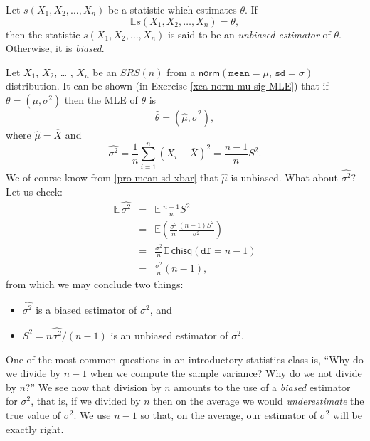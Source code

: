 \documentclass[captions=tableheading]{scrbook}
\begin{document}
\begin{defn}
Let \(s(X_{1},X_{2},\ldots,X_{n})\) be a statistic which estimates \(\theta\). If 
\[
\mathbb{E} s(X_{1},X_{2},\ldots,X_{n})=\theta,
\]
then the statistic \(s(X_{1},X_{2},\ldots,X_{n})\) is said to be an \emph{unbiased estimator} of \(\theta\). Otherwise, it is \emph{biased}.
\end{defn}

\begin{example}

Let \(X_{1}\), \(X_{2}\), \ldots{} , \(X_{n}\) be an \(SRS(n)\) from a \(\mathsf{norm}(\mathtt{mean}=\mu,\,\mathtt{sd}=\sigma)\) distribution. It can be shown (in Exercise \ref{xca-norm-mu-sig-MLE}) that if \(\mbox{$\theta$}=(\mu,\sigma^{2})\) then the MLE of \(\theta\) is
\begin{equation}
\hat{\theta}=(\hat{\mu},\hat{\sigma}^{2}),
\end{equation}
where \(\hat{\mu}=\overline{X}\) and
\begin{equation}
\hat{\sigma^{2}}=\frac{1}{n}\sum_{i=1}^{n}\left(X_{i}-\overline{X}\right)^{2}=\frac{n-1}{n}S^{2}.
\end{equation}
We of course know from \ref{pro-mean-sd-xbar} that \(\hat{\mu}\) is unbiased. What about \(\hat{\sigma^{2}}\)? Let us check: 
\begin{eqnarray*}
\mathbb{E}\,\hat{\sigma^{2}} & = & \mathbb{E}\,\frac{n-1}{n}S^{2}\\
 & = & \mathbb{E}\left(\frac{\sigma^{2}}{n}\frac{(n-1)S^{2}}{\sigma^{2}}\right)\\
 & = & \frac{\sigma^{2}}{n}\mathbb{E}\ \mathsf{chisq}(\mathtt{df}=n-1)\\
 & = & \frac{\sigma^{2}}{n}(n-1),
\end{eqnarray*}
from which we may conclude two things:
\begin{itemize}
\item \(\hat{\sigma^{2}}\) is a biased estimator of \(\sigma^{2}\), and
\item \(S^{2}=n\hat{\sigma^{2}}/(n-1)\) is an unbiased estimator of \(\sigma^{2}\).
\end{itemize}

\end{example}

One of the most common questions in an introductory statistics class is, ``Why do we divide by \(n-1\) when we compute the sample variance? Why do we not divide by \(n\)?'' We see now that division by \(n\) amounts to the use of a \emph{biased} estimator for \(\sigma^{2}\), that is, if we divided by \(n\) then on the average we would \emph{underestimate} the true value of \(\sigma^{2}\). We use \(n-1\) so that, on the average, our estimator of \(\sigma^{2}\) will be exactly right. 
\end{document}
